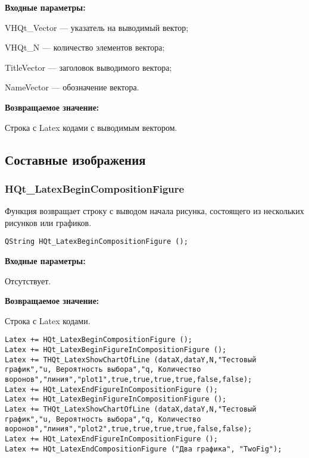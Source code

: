 \documentclass[a4paper,12pt]{article}
\begin{document}
\textbf{Входные параметры:}
 
VHQt\_Vector --- указатель на выводимый вектор;
 
VHQt\_N --- количество элементов вектора;
 
TitleVector --- заголовок выводимого вектора;
 
NameVector --- обозначение вектора.
	
\textbf{Возвращаемое значение:}

Строка с Latex кодами с выводимым вектором.


\subsection{Составные изображения}

\subsubsection{HQt\_LatexBeginCompositionFigure}\label{HQt_LatexBeginCompositionFigure}

Функция возвращает строку с выводом начала рисунка, состоящего из нескольких рисунков или графиков.


\begin{lstlisting}[label=code_syntax_HQt_LatexBeginCompositionFigure,caption=Синтаксис]
QString HQt_LatexBeginCompositionFigure ();
\end{lstlisting}

\textbf{Входные параметры:}

Отсутствует.

\textbf{Возвращаемое значение:}

Строка с Latex кодами.


\begin{lstlisting}[label=code_use_HQt_LatexBeginCompositionFigure,caption=Пример использования]
Latex += HQt_LatexBeginCompositionFigure ();
Latex += HQt_LatexBeginFigureInCompositionFigure ();
Latex += THQt_LatexShowChartOfLine (dataX,dataY,N,"Тестовый график","u, Вероятность выбора","q, Количество воронов","линия","plot1",true,true,true,true,false,false);
Latex += HQt_LatexEndFigureInCompositionFigure ();
Latex += HQt_LatexBeginFigureInCompositionFigure ();
Latex += THQt_LatexShowChartOfLine (dataX,dataY,N,"Тестовый график","u, Вероятность выбора","q, Количество воронов","линия","plot2",true,true,true,true,false,false);
Latex += HQt_LatexEndFigureInCompositionFigure ();
Latex += HQt_LatexEndCompositionFigure ("Два графика", "TwoFig");
\end{lstlisting}
\end{document}
